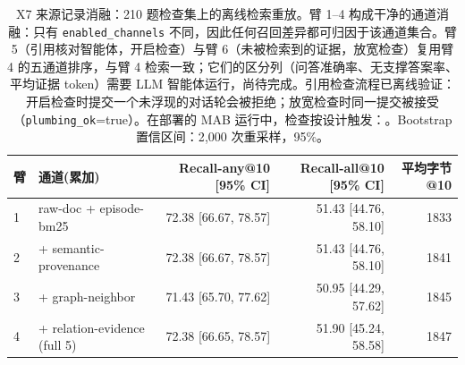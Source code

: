 \begin{table}[t]
\centering
\caption{X7 来源记录消融：210 题检查集上的离线检索重放。臂 1--4 构成干净的通道消融：只有 \texttt{enabled\_channels} 不同，因此任何召回差异都可归因于该通道集合。臂 5（引用核对智能体，开启检查）与臂 6（未被检索到的证据，放宽检查）复用臂 4 的五通道排序，与臂 4 检索一致；它们的区分列（问答准确率、无支撑答案率、平均证据 token）需要 LLM 智能体运行，尚待完成。引用检查流程已离线验证：开启检查时提交一个未浮现的对话轮会被拒绝；放宽检查时同一提交被接受（\texttt{plumbing\_ok}=true）。在部署的 MAB 运行中，检查按设计触发：\GateRejectStats{}。Bootstrap 置信区间：2{,}000 次重采样，95\%。}
\label{tab:provenance-ablation}
\small
\setlength{\tabcolsep}{3pt}
\begin{tabular}{llrrr}
\toprule
臂 & 通道(累加) & Recall-any@10 [95\% CI] & Recall-all@10 [95\% CI] & 平均字节@10 \\
\midrule
1 & raw-doc + episode-bm25 & 72.38 [66.67, 78.57] & 51.43 [44.76, 58.10] & 1833 \\
2 & + semantic-provenance & 72.38 [66.67, 78.57] & 51.43 [44.76, 58.10] & 1841 \\
3 & + graph-neighbor & 71.43 [65.70, 77.62] & 50.95 [44.29, 57.62] & 1845 \\
4 & + relation-evidence (full 5) & 72.38 [66.65, 78.57] & 51.90 [45.24, 58.58] & 1847 \\
\bottomrule
\end{tabular}
\end{table}
